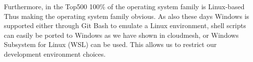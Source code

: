 \documentclass[utf8]{FrontiersinVancouver} %
\def\overleafhome{/tmp}%
\begin{document}
Furthermore, in the Top500 100\% of the operating system family is Linux-based Thus
making the operating system family obvious. As also these days Windows
is supported either through Git Bash to emulate a Linux environment, shell scripts
can easily be ported to Windows as we have shown in cloudmesh, or
Windows Subsystem for Linux (WSL) can be used.  This allows us to restrict our development environment choices.




\newenvironment{BOX}[1][title]
{
    \ifx\homepath\overleafhome
        \bigskip
        \begin{quote}
        \begin{mdframed}[hidealllines=true,backgroundcolor=yellow!20]
        \hline
        {\bf #1}
    \else
        \begin{tcolorbox}[title=#1]
    \fi
}
{
    \ifx\homepath\overleafhome
        \hline
        \end{mdframed}
        \end{quote}
    \else
        \end{tcolorbox}
    \fi
}
\end{document}
